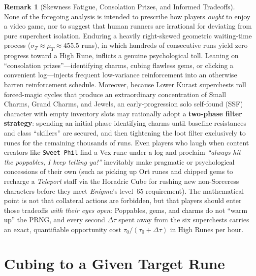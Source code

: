 \documentclass[11pt,reqno]{amsart}
\theoremstyle{definition}
\newtheorem{remark}[theorem]{Remark}
\begin{document}
\begin{remark}[Skewness Fatigue, Consolation Prizes, and Informed Tradeoffs]
None of the foregoing analysis is intended to prescribe how players \emph{ought} to enjoy a video game, nor to suggest that human runners are irrational for deviating from pure superchest isolation. Enduring a heavily right-skewed geometric waiting-time process ($\sigma_T \approx \mu_T \approx 455.5$ runs), in which hundreds of consecutive runs yield zero progress toward a High Rune, inflicts a genuine psychological toll. Leaning on ``consolation prizes''—identifying charms, cubing flawless gems, or clicking a convenient log—injects frequent low-variance reinforcement into an otherwise barren reinforcement schedule. Moreover, because Lower Kurast superchests roll forced-magic cycles that produce an extraordinary concentration of Small Charms, Grand Charms, and Jewels, an early-progression solo self-found (SSF) character with empty inventory slots may rationally adopt a \textbf{two-phase filter strategy}: spending an initial phase identifying charms until baseline resistances and class ``skillers'' are secured, and then tightening the loot filter exclusively to runes for the remaining thousands of runs. Even players who laugh when content creators like \texttt{Sweet Phil} find a Vex rune under a log and proclaim \emph{``always hit the poppables, I keep telling ya!''} inevitably make pragmatic or psychological concessions of their own (such as picking up Ort runes and chipped gems to recharge a \emph{Teleport} staff via the Horadric Cube for rushing new non-Sorceress characters before they meet \emph{Enigma}'s level~$65$ requirement). The mathematical point is not that collateral actions are forbidden, but that players should enter those tradeoffs \emph{with their eyes open}: Poppables, gems, and charms do not ``warm up'' the PRNG, and every second $\Delta\tau$ spent away from the six superchests carries an exact, quantifiable opportunity cost $\tau_0 / (\tau_0 + \Delta\tau)$ in High Runes per hour.
\end{remark}

\section{Cubing to a Given Target Rune}
\label{sec:cubing}
\end{document}
